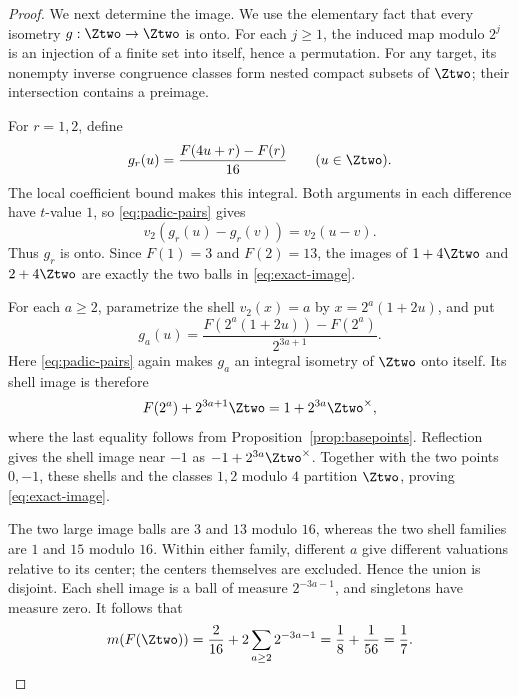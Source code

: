 \begin{proof}
We next determine the image. We use the elementary fact that every
isometry $g:\Ztwo\to\Ztwo$ is onto. For each $j\ge1$, the induced
map modulo $2^j$ is an injection of a finite set into itself, hence a
permutation. For any target, its nonempty inverse congruence classes
form nested compact subsets of $\Ztwo$; their intersection contains a
preimage.

For $r=1,2$, define
\[
 g_r(u)=\frac{F(4u+r)-F(r)}{16}\qquad(u\in\Ztwo).
\]
The local coefficient bound makes this integral. Both arguments in
each difference have $t$-value $1$, so \eqref{eq:padic-pairs} gives
\[
 v_2(g_r(u)-g_r(v))=v_2(u-v).
\]
Thus $g_r$ is onto. Since $F(1)=3$ and $F(2)=13$, the images of
$1+4\Ztwo$ and $2+4\Ztwo$ are exactly the two balls in
\eqref{eq:exact-image}.

For each $a\ge2$, parametrize the shell $v_2(x)=a$ by
$x=2^a(1+2u)$, and put
\[
 g_a(u)=\frac{F(2^a(1+2u))-F(2^a)}{2^{3a+1}}.
\]
Here \eqref{eq:padic-pairs} again makes $g_a$ an integral isometry of
$\Ztwo$ onto itself. Its shell image is therefore
\[
 F(2^a)+2^{3a+1}\Ztwo=1+2^{3a}\Ztwo^\times,
\]
where the last equality follows from
Proposition~\ref{prop:basepoints}. Reflection gives the shell image
near $-1$ as $-1+2^{3a}\Ztwo^\times$. Together with the two points
$0,-1$, these shells and the classes $1,2$ modulo $4$ partition
$\Ztwo$, proving \eqref{eq:exact-image}.

The two large image balls are $3$ and $13$ modulo $16$, whereas
the two shell families are $1$ and $15$ modulo $16$. Within either
family, different $a$ give different valuations relative to its
center; the centers themselves are excluded. Hence the union is
disjoint. Each shell image is a ball of measure $2^{-3a-1}$, and
singletons have measure zero. It follows that
\[
 m(F(\Ztwo))=\frac2{16}+2\sum_{a\ge2}2^{-3a-1}
 =\frac18+\frac1{56}=\frac17.
\]
\end{proof}
